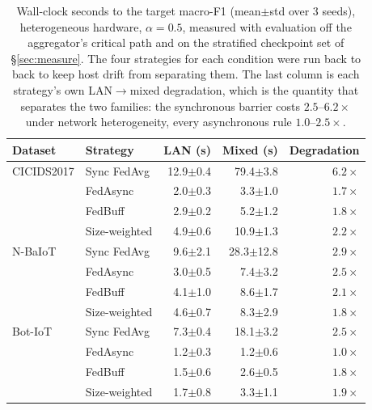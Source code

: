 \begin{table}[t]\centering
\caption{Wall-clock seconds to the target macro-F1 (mean$\pm$std over 3 seeds),
heterogeneous hardware, $\alpha{=}0.5$, measured with evaluation off the
aggregator's critical path and on the stratified checkpoint set of
\S\ref{sec:measure}. The four strategies for each condition were run back to
back to keep host drift from separating them. The last column is each
strategy's own LAN$\rightarrow$mixed degradation, which is the quantity that
separates the two families: the synchronous barrier costs $2.5$--$6.2\times$
under network heterogeneity, every asynchronous rule $1.0$--$2.5\times$.}
\label{tab:crossover}
\begin{tabular}{ll rr r}
\toprule
Dataset & Strategy & LAN (s) & Mixed (s) & Degradation \\
\midrule
CICIDS2017 & Sync FedAvg & 12.9$\pm$0.4 & 79.4$\pm$3.8 & $6.2\times$ \\
 & FedAsync & 2.0$\pm$0.3 & 3.3$\pm$1.0 & $1.7\times$ \\
 & FedBuff & 2.9$\pm$0.2 & 5.2$\pm$1.2 & $1.8\times$ \\
 & Size-weighted & 4.9$\pm$0.6 & 10.9$\pm$1.3 & $2.2\times$ \\
\midrule
N-BaIoT & Sync FedAvg & 9.6$\pm$2.1 & 28.3$\pm$12.8 & $2.9\times$ \\
 & FedAsync & 3.0$\pm$0.5 & 7.4$\pm$3.2 & $2.5\times$ \\
 & FedBuff & 4.1$\pm$1.0 & 8.6$\pm$1.7 & $2.1\times$ \\
 & Size-weighted & 4.6$\pm$0.7 & 8.3$\pm$2.9 & $1.8\times$ \\
\midrule
Bot-IoT & Sync FedAvg & 7.3$\pm$0.4 & 18.1$\pm$3.2 & $2.5\times$ \\
 & FedAsync & 1.2$\pm$0.3 & 1.2$\pm$0.6 & $1.0\times$ \\
 & FedBuff & 1.5$\pm$0.6 & 2.6$\pm$0.5 & $1.8\times$ \\
 & Size-weighted & 1.7$\pm$0.8 & 3.3$\pm$1.1 & $1.9\times$ \\
\bottomrule
\end{tabular}
\end{table}
